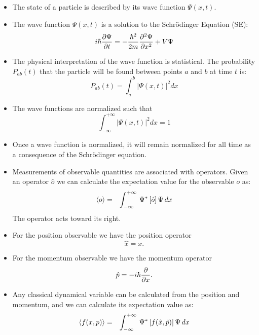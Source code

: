 \documentclass[12pt]{book}
\begin{document}
\begin{itemize}
\item The state of a particle is described by its wave function $\Psi(x,t)$.
\item The wave function $\Psi(x,t)$ is a solution to the Schr\"odinger Equation (SE):
\begin{equation}
\label{eqn:se}
i \hbar  \frac{\partial \Psi}{\partial t}  = - \frac{\hbar^2}{2 m} \frac{\partial^2 \Psi}{\partial x^2}  + V \Psi
\end{equation}
\item The physical interpretation of the wave function is statistical.  The probability $P_{ab}(t)$ that the particle will be found between points $a$ and $b$ at time $t$ is:
\begin{equation}
\label{eqn:prob}
P_{ab}(t) = \int_a^b |\Psi(x,t)|^2 dx
\end{equation}
\item The wave functions are normalized such that
\begin{equation}
\int_{-\infty}^{+\infty} |\Psi(x,t)|^2 dx = 1
\end{equation}
\item Once a wave function is normalized, it will remain normalized for all time as a consequence of the Schr\"odinger equation.
\item Measurements of observable quantities are associated with operators.  Given an operator $\hat{o}$ we can calculate the expectation value for the observable $o$ as:
\begin{eqnarray}
\braket{o}  &=& \int_{-\infty}^{+\infty} \, \Psi^* \left[ \hat{o} \right] \Psi \,dx 
\end{eqnarray}
The operator acts toward its right.
\item For the position observable we have the position operator 
\begin{equation}
\hat{x} = x.
\end{equation}
\item For the momentum observable we have the momentum operator 
\begin{equation}
\hat{p} = - i \hbar \frac{\partial}{\partial x}.
\end{equation}
\item Any classical dynamical variable can be calculated from the position and momentum, and we can calculate its expectation value as:
\begin{eqnarray}
\braket{f(x,p)}  &=& \int_{-\infty}^{+\infty} \, \Psi^* \left[ f(\hat{x},\hat{p}) \right] \Psi \,dx 
\end{eqnarray}

\end{itemize}
\end{document}
